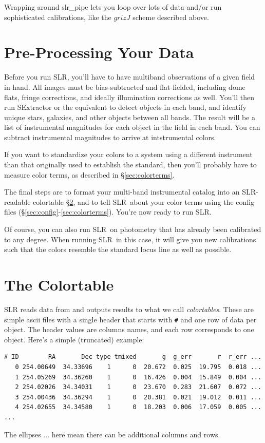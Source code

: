 \documentclass{report}
\newcommand{\slr}{SLR}
\begin{document}
Wrapping around slr\_pipe lets you loop over lots of data and/or run
sophisticated calibrations, like the $grizJ$ scheme described above.



\chapter{Pre-Processing Your Data}
\label{sec:prepost}

Before you run \slr, you'll have to have multiband observations of a
given field in hand.  All images must be bias-subtracted and
flat-fielded, including dome flats, fringe corrections, and ideally
illumination corrections as well.  You'll then run SExtractor or the
equivalent to detect objects in each band, and identify unique stars,
galaxies, and other objects between all bands.  The result will be a
list of instrumental magnitudes for each object in the field in each
band.  You can subtract instrumental magnitudes to arrive at
intstrumental colors.

If you want to standardize your colors to a system using a different
instrument than that originally used to establish the standard, then
you'll probably have to measure color terms, as described in
\S\ref{sec:colorterms}.

The final steps are to format your multi-band instrumental catalog
into an \slr-readable colortable \S\ref{sec:colortable}, and to tell
\slr\ about your color terms using the config files
(\S\ref{sec:config}-\ref{sec:colorterms}).  You're now ready to run
\slr.

Of course, you can also run \slr\ on photometry that has already been
calibrated to any degree.  When running \slr\ in this case, it will
give you new calibrations such that the colors resemble the standard
locus line as well as possible.






\chapter{The Colortable}
\label{sec:colortable}

SLR reads data from and outputs results to what we call {\it
  colortables}.  These are simple ascii files with a single header
that starts with \verb|#| and one row of data per object.  The header
values are columns names, and each row corresponds to one object.
Here's a simple (truncated) example:
\begin{verbatim}
# ID        RA       Dec type tmixed       g  g_err       r  r_err ...
   0 254.00649  34.33696    1      0  20.672  0.025  19.795  0.018 ...
   1 254.05269  34.36260    1      0  16.426  0.004  15.849  0.004 ...
   2 254.02026  34.34031    1      0  23.670  0.283  21.607  0.072 ...
   3 254.00436  34.36294    1      0  20.381  0.021  19.012  0.011 ...
   4 254.02655  34.34580    1      0  18.203  0.006  17.059  0.005 ...
...
\end{verbatim}
The ellipses ... here mean there can be additional columns and rows.
\end{document}
